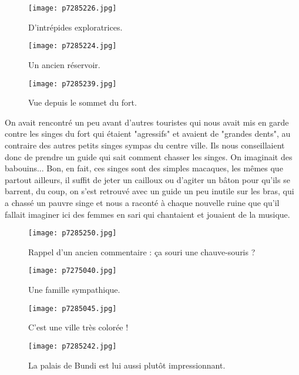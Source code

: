\documentclass{book}
\begin{document}
\begin{figure}[h]
\centering
\texttt{[image: p7285226.jpg]}
\caption*{D'intrépides exploratrices.}
\end{figure}


\begin{figure}[h]
\centering
\texttt{[image: p7285224.jpg]}
\caption*{Un ancien réservoir.}
\end{figure}


\begin{figure}[h]
\centering
\texttt{[image: p7285239.jpg]}
\caption*{Vue depuis le sommet du fort.}
\end{figure}

On avait rencontré un peu avant d'autres touristes qui nous avait mis en garde contre les singes du fort qui étaient "agressifs" et avaient de "grandes dents", au contraire des autres petits singes sympas du centre ville. Ils nous conseillaient donc de prendre un guide qui sait comment chasser les singes. On imaginait des babouins... Bon, en fait, ces singes sont des simples macaques, les mêmes que partout ailleurs, il suffit de jeter un cailloux ou d'agiter un bâton pour qu'ils se barrent, du coup, on s'est retrouvé avec un guide un peu inutile sur les bras, qui a chassé un pauvre singe et nous a raconté à chaque nouvelle ruine que qu'il fallait imaginer ici des femmes en sari qui chantaient et jouaient de la musique.




\begin{figure}[h]
\centering
\texttt{[image: p7285250.jpg]}
\caption*{Rappel d'un ancien commentaire : ça souri une chauve-souris ?}
\end{figure}


\begin{figure}[h]
\centering
\texttt{[image: p7275040.jpg]}
\caption*{Une famille sympathique.}
\end{figure}


\begin{figure}[h]
\centering
\texttt{[image: p7285045.jpg]}
\caption*{C'est une ville très colorée !}
\end{figure}


\begin{figure}[h]
\centering
\texttt{[image: p7285242.jpg]}
\caption*{La palais de Bundi est lui aussi plutôt impressionnant.}
\end{figure}
\end{document}
